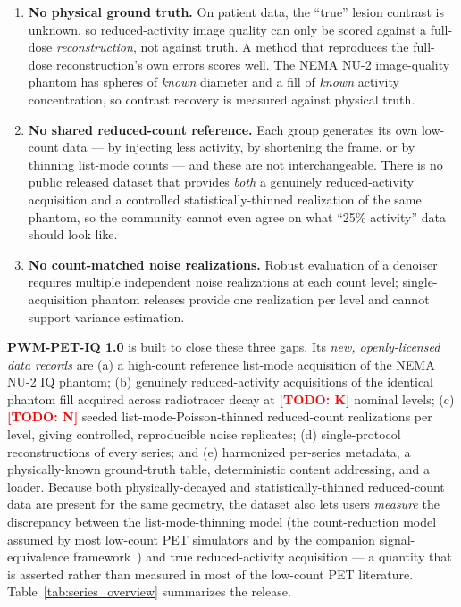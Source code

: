 \documentclass[twoside,11pt]{article}
\newcommand{\todo}[1]{\textcolor{red}{\textbf{[TODO: #1]}}}
\begin{document}
\begin{enumerate}
    \item \textbf{No physical ground truth.} On patient data, the ``true'' lesion
    contrast is unknown, so reduced-activity image quality can only be scored
    against a full-dose \emph{reconstruction}, not against truth. A method that
    reproduces the full-dose reconstruction's own errors scores well. The NEMA
    NU-2 image-quality phantom has spheres of \emph{known} diameter and a fill of
    \emph{known} activity concentration, so contrast recovery is measured against
    physical truth.
    \item \textbf{No shared reduced-count reference.} Each group generates its own
    low-count data --- by injecting less activity, by shortening the frame, or by
    thinning list-mode counts --- and these are not interchangeable. There is no
    public released dataset that provides \emph{both} a genuinely reduced-activity
    acquisition and a controlled statistically-thinned realization of the same
    phantom, so the community cannot even agree on what ``25\% activity'' data
    should look like.
    \item \textbf{No count-matched noise realizations.} Robust evaluation of a
    denoiser requires multiple independent noise realizations at each count level;
    single-acquisition phantom releases provide one realization per level and
    cannot support variance estimation.
\end{enumerate}

\textbf{PWM-PET-IQ 1.0} is built to close these three gaps. Its
\emph{new, openly-licensed data records} are (a) a high-count reference list-mode
acquisition of the NEMA NU-2 IQ phantom; (b) genuinely reduced-activity
acquisitions of the identical phantom fill acquired across radiotracer decay at
\todo{K} nominal levels; (c) \todo{N} seeded list-mode-Poisson-thinned reduced-count
realizations per level, giving controlled, reproducible noise replicates; (d)
single-protocol reconstructions of every series; and (e) harmonized per-series
metadata, a physically-known ground-truth table, deterministic content addressing,
and a loader. Because both physically-decayed and statistically-thinned
reduced-count data are present for the same geometry, the dataset also lets users
\emph{measure} the discrepancy between the list-mode-thinning model (the
count-reduction model assumed by most low-count PET simulators and by the
companion signal-equivalence framework~\citep{ws2framework}) and true
reduced-activity acquisition --- a quantity that is asserted rather than measured
in most of the low-count PET literature. Table~\ref{tab:series_overview} summarizes
the release.
\end{document}
